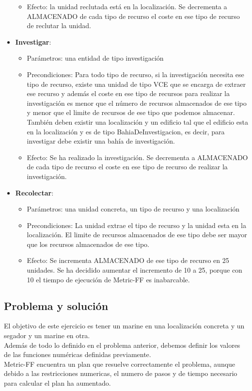 \begin{itemize}
\begin{itemize}
         \item Efecto: la unidad reclutada está en la localización. Se decrementa a ALMACENADO de cada tipo de recurso el coste en ese tipo de recurso de reclutar la unidad.
      \end{itemize}
   \item \textbf{Investigar}:
      \begin{itemize}
         \item Parámetros: una entidad de tipo investigación
         \item Precondiciones: Para todo tipo de recurso, si la investigación necesita ese tipo de recurso, existe una unidad de tipo VCE que se encarga de extraer ese recurso y además el coste en ese tipo de recursos para realizar la investigación es menor que el número de recursos almacenados de ese tipo y menor que el limite de recursos de ese tipo que podemos almacenar. También deben existir una localización y un edificio tal que el edificio esta en la localización y es de tipo BahiaDeInvestigacion, es decir, para investigar debe existir una bahía de investigación.
         \item Efecto: Se ha realizado la investigación. Se decrementa a ALMACENADO de cada tipo de recurso el coste en ese tipo de recurso de realizar la investigación.
      \end{itemize}
   \item \textbf{Recolectar}:
         \begin{itemize}
            \item Parámetros: una unidad concreta, un tipo de recurso y una localización
            \item Precondiciones: La unidad extrae el tipo de recurso y la unidad esta en la localización. El limite de recursos almacenados de ese tipo debe ser mayor que los recursos almacenados de ese tipo.
            \item Efecto: Se incrementa ALMACENADO de ese tipo de recurso en 25 unidades. Se ha decidido aumentar el incremento de 10 a 25, porque con 10 el tiempo de ejecución de Metric-FF es inabarcable.
         \end{itemize}
\end{itemize}
\subsection{Problema y solución}
El objetivo de este ejercicio es tener un marine en una localización concreta y un segador y un marine en otra.\\
Además de todo lo definido en el problema anterior, debemos definir los valores de las funciones numéricas definidas previamente.\\
Metric-FF encuentra un plan que resuelve correctamente el problema, aunque debido a las restricciones numericas, el numero de pasos y de tiempo necesario para calcular el plan ha aumentado.

